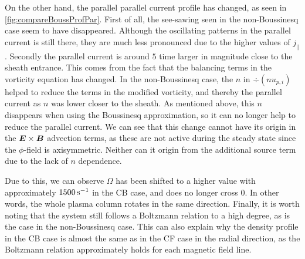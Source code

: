 On the other hand, the parallel parallel current profile has changed, as seen in \cref{fig:compareBoussProfPar}.
First of all, the see-sawing seen in the non-Boussinesq case seem to have disappeared.
Although the oscillating patterns in the parallel current is still there, they are much less pronounced due to the higher values of $j_\|$.
Secondly the parallel current is around $5$ time larger in magnitude close to the sheath entrance.
This comes from the fact that the balancing terms in the vorticity equation has changed.
In the non-Boussinesq case, the $n$ in $\div(nu_{p,i})$ helped to reduce the terms in the modified vorticity, and thereby the parallel current as $n$ was lower closer to the sheath.
As mentioned above, this $n$ disappears when using the Boussinesq approximation, so it can no longer help to reduce the parallel current.
We can see that this change cannot have its origin in the $\boldsymbol{E}\times\boldsymbol{B}$ advection terms, as these are not active during the steady state since the $\phi$-field is axisymmetric.
Neither can it origin from the additional source term due to the lack of $n$ dependence.

Due to this, we can observe $\Omega$ has been shifted to a higher value with approximately $1500 \, \text{s}^{-1}$ in the CB case, and does no longer cross $0$.
In other words, the whole plasma column rotates in the same direction.
Finally, it is worth noting that the system still follows a Boltzmann relation to a high degree, as is the case in the non-Boussinesq case.
This can also explain why the density profile in the CB case is almost the same as in the CF case in the radial direction, as the Boltzmann relation approximately holds for each magnetic field line.
%

